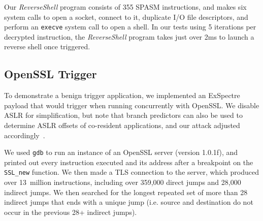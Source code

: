 

Our \textit{ReverseShell} program consists of 355 SPASM instructions, and
makes six system calls to open a socket,
connect to it, duplicate I/O file descriptors, and perform an \texttt{execve}
system call to open a shell.
In our tests using 5 iterations per decrypted instruction, the
\textit{ReverseShell} program takes just over 2ms to launch a reverse shell
once triggered.


\FigSpasmModel

\subsection{OpenSSL Trigger}
\label{subsec:openssl-impl}


To demonstrate a benign trigger application, we implemented an ExSpectre payload that
would trigger when running concurrently with OpenSSL.
We disable
ASLR for simplification, but note that
branch predictors can also be used to determine ASLR offsets of co-resident applications,
and our attack adjusted accordingly~\cite{evtyushkin2016jump}.

We used \texttt{gdb} to run an instance of an OpenSSL server (version 1.0.1f),
and printed out every instruction executed and its address after a breakpoint on
the \texttt{SSL\_new} function. We then made a TLS connection to the
server,
which produced over 13~million instructions, including over 359,000 direct jumps
and 28,000 indirect jumps. We then searched for the longest repeated set of more than
28 indirect jumps that ends with a unique jump (i.e. source and destination do
not occur in the previous 28+ indirect jumps).

